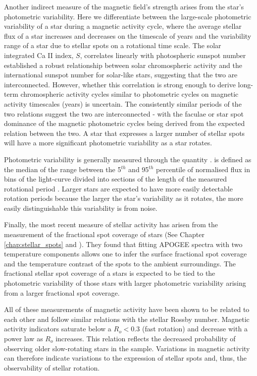 Another indirect measure of the magnetic field's strength arises from the star's photometric variability.
Here we differentiate between the large-scale photometric variability of a star during a magnetic activity cycle, where the average stellar flux of a star increases and decreases on the timescale of years and the variability range of a star due to stellar spots on a rotational time scale.
The solar integrated Ca II index, $S$, correlates linearly with photospheric sunspot number \citep{lorenzo_fine_2016, lorenzo_solar_2018} established a robust relationship between solar chromospheric activity and the international sunspot number for solar-like stars, suggesting that the two are interconnected. 
However, whether this correlation is strong enough to derive long-term chromospheric activity cycles similar to photometric cycles on magnetic activity timescales (years) is uncertain.
The consistently similar periods of the two relations suggest the two are interconnected - with the faculae or star spot dominance of the magnetic photometric cycles being derived from the expected relation between the two.
A star that expresses a larger number of stellar spots will have a more significant photometric variability as a star rotates.

Photometric variability is generally measured through the quantity \rper{}.
\rper{} is defined as the median of the range between the 5$^{th}$ and 95$^{th}$ percentile of normalised flux in bins of the light-curve divided into sections of the length of the measured rotational period \citep{mcquillan_rotation_2014}.
Larger \rper{} stars are expected to have more easily detectable rotation periods because the larger the star's variability as it rotates, the more easily distinguishable this variability is from noise.

Finally, the most recent measure of stellar activity has arisen from the measurement of the fractional spot coverage of stars (See Chapter \ref{chap:stellar_spots} and \citep{cao_starspots_2022}).
They found that fitting APOGEE spectra with two temperature components allows one to infer the surface fractional spot coverage and the temperature contrast of the spots to the ambient surroundings.
The fractional stellar spot coverage of a stars is expected to be tied to the photometric variability of those stars with larger photometric variability arising from a larger fractional spot coverage.

All of these measurements of magnetic activity have been shown to be related to each other and follow similar relations with the stellar Rossby number.
Magnetic activity indicators saturate below a $R_o<0.3$ \citep{cao_starspots_2022} (fast rotation) and decrease with a power law as $R_o$ increases.
This relation reflects the decreased probability of observing older slow-rotating stars in the \citet{mcquillan_rotation_2014} sample.
Variations in magnetic activity can therefore indicate variations to the expression of stellar spots and, thus, the observability of stellar rotation.

